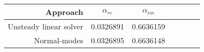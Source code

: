 \begin{tabular}{rcccccc}
    \toprule
    Approach & $\alpha_{re}$ & $\alpha_{im}$ \\ 
    \midrule
Unsteady linear solver & 0.0326891 & 0.6636159 \\
Normal-modes & 0.0326895 & 0.6636148 \\
    \bottomrule
\end{tabular}